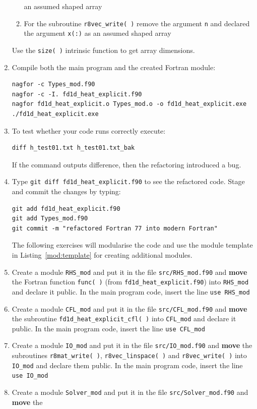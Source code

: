 \documentclass[12pt]{article}
\begin{document}
\begin{enumerate}
\begin{enumerate}
an assumed shaped array
\item For the subroutine \texttt{r8vec\_write( )} remove the argument \texttt{n} and declared the argument \texttt{x(:)} as
an assumed shaped array
\end{enumerate}
Use the \texttt{size( )} intrinsic function to get array dimensions. 
\item Compile both the main program and the created Fortran module:
\begin{verbatim}
nagfor -c Types_mod.f90
nagfor -c -I. fd1d_heat_explicit.f90
nagfor fd1d_heat_explicit.o Types_mod.o -o fd1d_heat_explicit.exe
./fd1d_heat_explicit.exe
\end{verbatim}
\item To test whether your code runs correctly execute:
\begin{verbatim}
diff h_test01.txt h_test01.txt_bak
\end{verbatim}
If the command outputs difference, then the refactoring introduced a bug.
\item Type \texttt{git diff fd1d\_heat\_explicit.f90} to see the refactored code. Stage and commit
the changes by typing: 
\begin{verbatim}
git add fd1d_heat_explicit.f90
git add Types_mod.f90
git commit -m "refactored Fortran 77 into modern Fortran"
\end{verbatim}
The following exercises will modularise the code and use the module template in
  Listing~\ref{mod:template} for creating additional modules.
\item Create a module \texttt{RHS\_mod} and put it in the file \texttt{src/RHS\_mod.f90} and {\bf move} the 
Fortran function \texttt{func( )} (from \texttt{fd1d\_heat\_explicit.f90}) into \texttt{RHS\_mod} and declare it public. In the main program code, 
insert the line \texttt{use RHS\_mod} 
\item Create a module \texttt{CFL\_mod} and put it in the file \texttt{src/CFL\_mod.f90} and {\bf move} the
  subroutine \texttt{fd1d\_heat\_explicit\_cfl( )} into \texttt{CFL\_mod} and declare it
  public. In the main program
code, insert the line \texttt{use CFL\_mod}
\item Create a module \texttt{IO\_mod} and put it in the file \texttt{src/IO\_mod.f90} and {\bf move}
  the subroutines \texttt{r8mat\_write( )}, \texttt{r8vec\_linspace( )} and \texttt{r8vec\_write( )}
  into \texttt{IO\_mod} and declare them public. In the main program code, insert the line \texttt{use IO\_mod}
\item Create a module \texttt{Solver\_mod} and put it in the file \texttt{src/Solver\_mod.f90} and {\bf move} the

\end{enumerate}
\end{document}
